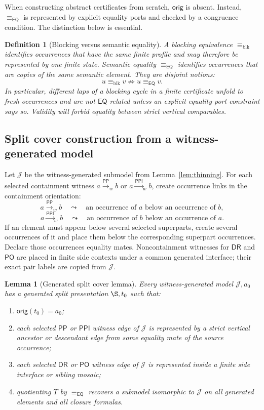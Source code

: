 \documentclass[11pt]{article}
\newtheorem{lemma}[theorem]{Lemma}
\newtheorem{definition}[theorem]{Definition}
\newcommand{\EQ}{\mathsf{EQ}}
\newcommand{\DR}{\mathsf{DR}}
\newcommand{\PO}{\mathsf{PO}}
\newcommand{\PP}{\mathsf{PP}}
\newcommand{\PPI}{\mathsf{PPI}}
\newcommand{\J}{\mathcal J}
\newcommand{\orig}{\mathsf{orig}}
\newcommand{\eqc}{\equiv_{\EQ}}
\newcommand{\blkeq}{\equiv_{\mathrm{blk}}}
\begin{document}
When constructing abstract certificates from scratch, $\orig$ is absent.  Instead, $\eqc$ is represented by explicit equality ports and checked by a congruence condition.  The distinction below is essential.

\begin{definition}[Blocking versus semantic equality]
A blocking equivalence $\blkeq$ identifies occurrences that have the same finite profile and may therefore be represented by one finite state.  Semantic equality $\eqc$ identifies occurrences that are copies of the same semantic element.  They are disjoint notions:
\[
  u\blkeq v \not\Rightarrow u\eqc v.
\]
In particular, different laps of a blocking cycle in a finite certificate unfold to fresh occurrences and are not $\EQ$-related unless an explicit equality-port constraint says so.  Validity will forbid equality between strict vertical comparables.
\end{definition}

\subsection{Split cover construction from a witness-generated model}

Let $\J$ be the witness-generated submodel from Lemma~\ref{lem:thinning}.  For each selected containment witness $a\xrightarrow{\PP}_w b$ or $a\xrightarrow{\PPI}_w b$, create occurrence links in the containment orientation:
\[
  a\xrightarrow{\PP}_w b \quad\leadsto\quad
  \text{an occurrence of }a\text{ below an occurrence of }b,
\]
\[
  a\xrightarrow{\PPI}_w b \quad\leadsto\quad
  \text{an occurrence of }b\text{ below an occurrence of }a.
\]
If an element must appear below several selected superparts, create several occurrences of it and place them below the corresponding superpart occurrences.  Declare those occurrences equality mates.  Noncontainment witnesses for $\DR$ and $\PO$ are placed in finite side contexts under a common generated interface; their exact pair labels are copied from $\J$.

\begin{lemma}[Generated split cover lemma]\label{lem:split-cover}
Every witness-generated model $\J,a_0$ has a generated split presentation $\S,t_0$ such that:
\begin{enumerate}[label=(C\arabic*)]
\item $\orig(t_0)=a_0$;
\item each selected $\PP$ or $\PPI$ witness edge of $\J$ is represented by a strict vertical ancestor or descendant edge from some equality mate of the source occurrence;
\item each selected $\DR$ or $\PO$ witness edge of $\J$ is represented inside a finite side interface or sibling mosaic;
\item quotienting $T$ by $\eqc$ recovers a submodel isomorphic to $\J$ on all generated elements and all closure formulas.
\end{enumerate}
\end{lemma}
\end{document}
